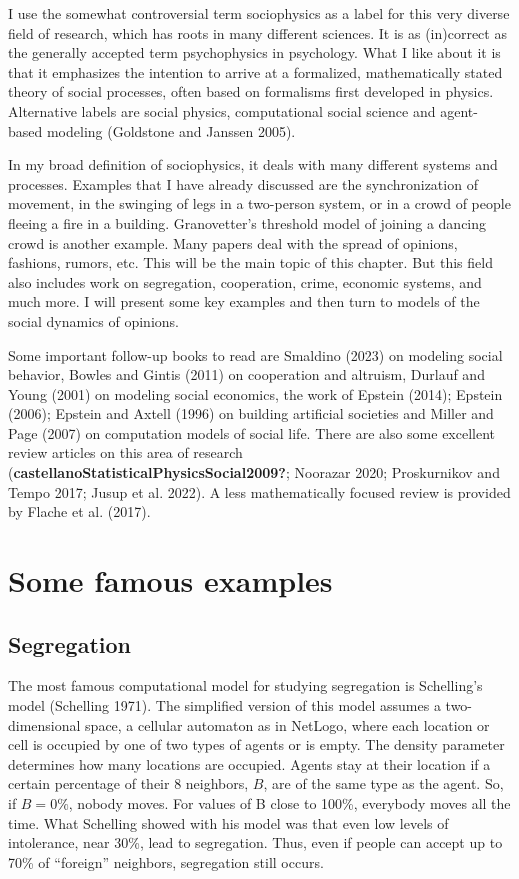 \documentclass[
  a4paper,
  DIV=11,
  numbers=noendperiod,
  oneside]{scrreprt}
\begin{document}
I use the somewhat controversial term sociophysics as a label for this
very diverse field of research, which has roots in many different
sciences. It is as (in)correct as the generally accepted term
psychophysics in psychology. What I like about it is that it emphasizes
the intention to arrive at a formalized, mathematically stated theory of
social processes, often based on formalisms first developed in physics.
Alternative labels are social physics, computational social science and
agent-based modeling (Goldstone and Janssen 2005).

In my broad definition of sociophysics, it deals with many different
systems and processes. Examples that I have already discussed are the
synchronization of movement, in the swinging of legs in a two-person
system, or in a crowd of people fleeing a fire in a building.
Granovetter's threshold model of joining a dancing crowd is another
example. Many papers deal with the spread of opinions, fashions, rumors,
etc. This will be the main topic of this chapter. But this field also
includes work on segregation, cooperation, crime, economic systems, and
much more. I will present some key examples and then turn to models of
the social dynamics of opinions.

Some important follow-up books to read are Smaldino (2023) on modeling
social behavior, Bowles and Gintis (2011) on cooperation and altruism,
Durlauf and Young (2001) on modeling social economics, the work of
Epstein (2014); Epstein (2006); Epstein and Axtell (1996) on building
artificial societies and Miller and Page (2007) on computation models of
social life. There are also some excellent review articles on this area
of research (\textbf{castellanoStatisticalPhysicsSocial2009?}; Noorazar
2020; Proskurnikov and Tempo 2017; Jusup et al. 2022). A less
mathematically focused review is provided by Flache et al. (2017).

\hypertarget{sec-Some-famous-examples}{%
\section{Some famous examples}\label{sec-Some-famous-examples}}

\hypertarget{sec-Segregation}{%
\subsection{Segregation}\label{sec-Segregation}}

The most famous computational model for studying segregation is
Schelling's model (Schelling 1971). The simplified version of this model
assumes a two-dimensional space, a cellular automaton as in NetLogo,
where each location or cell is occupied by one of two types of agents or
is empty. The density parameter determines how many locations are
occupied. Agents stay at their location if a certain percentage of their
8 neighbors, \(B\), are of the same type as the agent. So, if
\(B = 0\%\), nobody moves. For values of B close to 100\%, everybody
moves all the time. What Schelling showed with his model was that even
low levels of intolerance, near 30\%, lead to segregation. Thus, even if
people can accept up to 70\% of ``foreign'' neighbors, segregation still
occurs.
\end{document}
